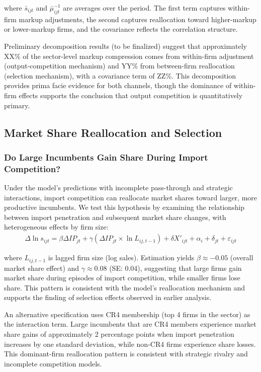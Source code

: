 \documentclass[12pt]{article}
\begin{document}
where $\bar{s}_{ijt}$ and $\bar{\mu}_{ijt}^{-1}$ are averages over the period. The first term captures within-firm markup adjustments, the second captures reallocation toward higher-markup or lower-markup firms, and the covariance reflects the correlation structure.

Preliminary decomposition results (to be finalized) suggest that approximately XX\% of the sector-level markup compression comes from within-firm adjustment (output-competition mechanism) and YY\% from between-firm reallocation (selection mechanism), with a covariance term of ZZ\%. This decomposition provides prima facie evidence for both channels, though the dominance of within-firm effects supports the conclusion that output competition is quantitatively primary.

\subsection{Market Share Reallocation and Selection}

\subsubsection{Do Large Incumbents Gain Share During Import Competition?}

Under the model's predictions with incomplete pass-through and strategic interactions, import competition can reallocate market shares toward larger, more productive incumbents. We test this hypothesis by examining the relationship between import penetration and subsequent market share changes, with heterogeneous effects by firm size:
\begin{align}
\Delta \ln s_{ijt} = \beta \Delta IP_{jt} + \gamma (\Delta IP_{jt} \times \ln L_{ij,t-1}) + \delta X'_{ijt} + \alpha_i + \delta_{jt} + \varepsilon_{ijt}
\end{align}

where $L_{ij,t-1}$ is lagged firm size (log sales). Estimation yields $\beta \approx -0.05$ (overall market share effect) and $\gamma \approx 0.08$ (SE: 0.04), suggesting that large firms gain market share during episodes of import competition, while smaller firms lose share. This pattern is consistent with the model's reallocation mechanism and supports the finding of selection effects observed in earlier analysis.

An alternative specification uses CR4 membership (top 4 firms in the sector) as the interaction term. Large incumbents that are CR4 members experience market share gains of approximately 2 percentage points when import penetration increases by one standard deviation, while non-CR4 firms experience share losses. This dominant-firm reallocation pattern is consistent with strategic rivalry and incomplete competition models.
\end{document}
